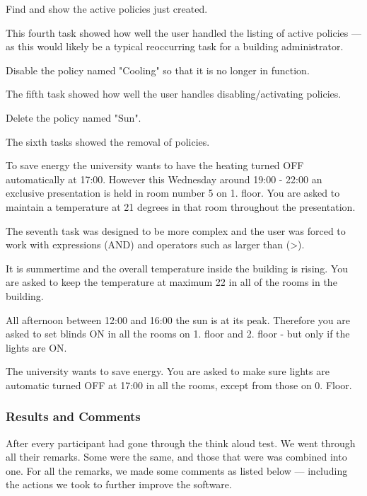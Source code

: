 \begin{framed}
Find and show the active policies just created.
\end{framed}
This fourth task showed how well the user handled the listing of active policies --- as this would likely be a typical reoccurring task for a building administrator.

\begin{framed}
Disable the policy named "Cooling" so that it is no longer in function.
\end{framed}
The fifth task showed how well the user handles disabling/activating policies.

\begin{framed}
Delete the policy named "Sun".
\end{framed}
The sixth tasks showed the removal of policies.

\begin{framed}
To save energy the university wants to have the heating turned OFF automatically at 17:00. However this Wednesday around 19:00 - 22:00 an exclusive presentation is held in room number 5 on 1. floor.
You are asked to maintain a temperature at 21 degrees in that room throughout the presentation.
\end{framed}
The seventh task was designed to be more complex and the user was forced to work with expressions (AND) and operators such as larger than (\textgreater).

\begin{framed}
It is summertime and the overall temperature inside the building is rising. You are asked to keep the temperature at maximum 22 in all of the rooms in the building.
\end{framed}

\begin{framed}
All afternoon between 12:00 and 16:00 the sun is at its peak. Therefore you are asked to set blinds ON in all the rooms on 1. floor and 2. floor - but only if the lights are ON.
\end{framed}

\begin{framed}
The university wants to save energy. You are asked to make sure lights are automatic turned OFF at 17:00 in all the rooms, except from those on 0. Floor.
\end{framed}

\subsubsection{Results and Comments}
\label{results-and-comments}
After every participant had gone through the think aloud test. We went through all their remarks. Some were the same, and those that were was combined into one.
For all the remarks, we made some comments as listed below --- including the actions we took to further improve the software.

